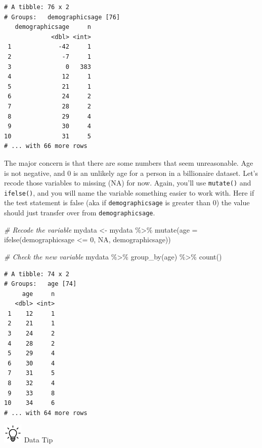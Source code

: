 \documentclass[
]{book}
\newenvironment{Shaded}{\begin{snugshade}}{\end{snugshade}}
\newcommand{\AttributeTok}[1]{\textcolor[rgb]{0.77,0.63,0.00}{#1}}
\newcommand{\CommentTok}[1]{\textcolor[rgb]{0.56,0.35,0.01}{\textit{#1}}}
\newcommand{\ConstantTok}[1]{\textcolor[rgb]{0.00,0.00,0.00}{#1}}
\newcommand{\DecValTok}[1]{\textcolor[rgb]{0.00,0.00,0.81}{#1}}
\newcommand{\FunctionTok}[1]{\textcolor[rgb]{0.00,0.00,0.00}{#1}}
\newcommand{\NormalTok}[1]{#1}
\newcommand{\OtherTok}[1]{\textcolor[rgb]{0.56,0.35,0.01}{#1}}
\newcommand{\SpecialCharTok}[1]{\textcolor[rgb]{0.00,0.00,0.00}{#1}}
\begin{document}
\begin{verbatim}
# A tibble: 76 x 2
# Groups:   demographicsage [76]
   demographicsage     n
             <dbl> <int>
 1             -42     1
 2              -7     1
 3               0   383
 4              12     1
 5              21     1
 6              24     2
 7              28     2
 8              29     4
 9              30     4
10              31     5
# ... with 66 more rows
\end{verbatim}

The major concern is that there are some numbers that seem unreasonable. Age is not negative, and 0 is an unlikely age for a person in a billionaire dataset. Let's recode those variables to missing (NA) for now. Again, you'll use \texttt{mutate()} and \texttt{ifelse()}, and you will name the variable something easier to work with. Here if the test statement is false (aka if \texttt{demographicsage} is greater than 0) the value should just transfer over from \texttt{demographicsage}.

\begin{Shaded}
\begin{Highlighting}[]
\CommentTok{\# Recode the variable}
\NormalTok{mydata }\OtherTok{\textless{}{-}}\NormalTok{ mydata }\SpecialCharTok{\%\textgreater{}\%}
  \FunctionTok{mutate}\NormalTok{(}\AttributeTok{age =} \FunctionTok{ifelse}\NormalTok{(demographicsage }\SpecialCharTok{\textless{}=} \DecValTok{0}\NormalTok{, }\ConstantTok{NA}\NormalTok{, demographicsage)) }

\CommentTok{\# Check the new variable}
\NormalTok{mydata }\SpecialCharTok{\%\textgreater{}\%}
  \FunctionTok{group\_by}\NormalTok{(age) }\SpecialCharTok{\%\textgreater{}\%}
  \FunctionTok{count}\NormalTok{()}
\end{Highlighting}
\end{Shaded}

\begin{verbatim}
# A tibble: 74 x 2
# Groups:   age [74]
     age     n
   <dbl> <int>
 1    12     1
 2    21     1
 3    24     2
 4    28     2
 5    29     4
 6    30     4
 7    31     5
 8    32     4
 9    33     8
10    34     6
# ... with 64 more rows
\end{verbatim}

\includegraphics[width=0.36458in,height=\textheight]{images/bulb.png} Data Tip
\end{document}
